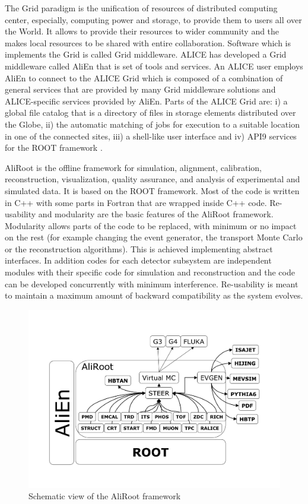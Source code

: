 The Grid paradigm is the unification of resources of distributed computing center, especially, computing power and storage, to provide them to users all over the World. It allows to provide their resources to wider community and the makes local resources to be shared with entire collaboration. Software which is implements the Grid is called Grid middleware. ALICE has developed a Grid middleware called AliEn \cite{cite:alien} that is set of tools and services. An ALICE user employs AliEn to connect to the ALICE Grid which is composed of a combination of general services that are provided by many Grid middleware solutions and ALICE-specific services provided by AliEn. Parts of the ALICE Grid are: i) a global file catalog that is a directory of files in storage elements distributed over the Globe, ii) the automatic matching of jobs for execution to a suitable location in one of the connected sites, iii) a shell-like user interface and iv) API9 services for the ROOT framework \cite{cite:aliroot}.


AliRoot \cite{cite:ALICE} is the offline framework for simulation, alignment, calibration, reconstruction, visualization, quality assurance, and analysis of experimental and simulated data. It is based on the ROOT framework. Most of the code is written in C++ with some parts in Fortran that are wrapped inside C++ code. Re-usability and modularity are the basic features of the AliRoot framework. Modularity allows parts of the code to be replaced, with minimum or no impact on the rest (for example changing the event generator, the transport Monte Carlo or the reconstruction algorithms). This is achieved implementing abstract interfaces. In addition codes for each detector subsystem are independent modules with their specific code for simulation and reconstruction and the code can be developed concurrently with minimum interference. Re-usability is meant to maintain a maximum amount of backward compatibility as the system evolves.

\begin{figure}[htbp]
\begin{center}
\includegraphics[width=16.cm]{./Version1/FigChapter4/FigureAliRoot}
\caption{Schematic view of the AliRoot framework}
\label{fig:aliroot}
\end{center}
\end{figure}

